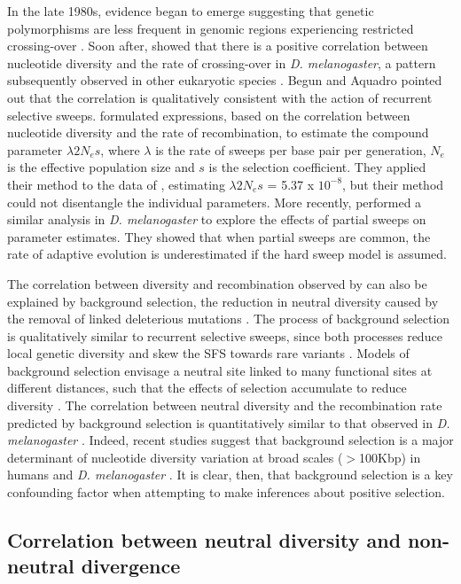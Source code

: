 In the late 1980s, evidence began to emerge suggesting that genetic polymorphisms are less frequent in genomic regions experiencing restricted crossing-over \citep{RN225,RN282}. Soon after, \cite{RN114} showed that there is a positive correlation between nucleotide diversity and the rate of crossing-over in \emph{D. melanogaster}, a pattern subsequently observed in other eukaryotic species \citep{RN117}. Begun and Aquadro pointed out that the correlation is qualitatively consistent with the action of recurrent selective sweeps. \cite{RN277} formulated expressions, based on the correlation between nucleotide diversity and the rate of recombination, to estimate the compound parameter $\lambda 2N_{e}s$, where $\lambda$ is the rate of sweeps per base pair per generation, $N_e$ is the effective population size and $s$ is the selection coefficient. They applied their method to the data of \cite{RN114}, estimating $\lambda2N_{e}s$ = 5.37 x $10^{-8}$, but their method could not disentangle the individual parameters. More recently, \cite{RN226} performed a similar analysis in \emph{D. melanogaster} to explore the effects of partial sweeps on parameter estimates. They showed that when partial sweeps are common, the rate of adaptive evolution is underestimated if the hard sweep model is assumed.
 
The correlation between diversity and recombination observed by \cite{RN114} can also be explained by background selection, the reduction in neutral diversity caused by the removal of linked deleterious mutations \citep{RN132}. The process of background selection is qualitatively similar to recurrent selective sweeps, since both processes reduce local genetic diversity \citep{RN110} and skew the SFS towards rare variants \citep{RN287,RN133}. Models of background selection envisage a neutral site linked to many functional sites at different distances, such that the effects of selection accumulate to reduce diversity \citep{RN206, RN157}. The correlation between neutral diversity and the recombination rate predicted by background selection is quantitatively similar to that observed in \emph{D. melanogaster} \citep{RN281}. Indeed, recent studies suggest that background selection is a major determinant of nucleotide diversity variation at broad scales ($>$100Kbp) in humans \cite{RN120} and \emph{D. melanogaster} \citep{RN288, RN116}. It is clear, then, that background selection is a key confounding factor when attempting to make inferences about positive selection.
 
\subsection[Correlations between neutral diversity and non-neutral divergence]{Correlation between neutral diversity and non-neutral divergence}

